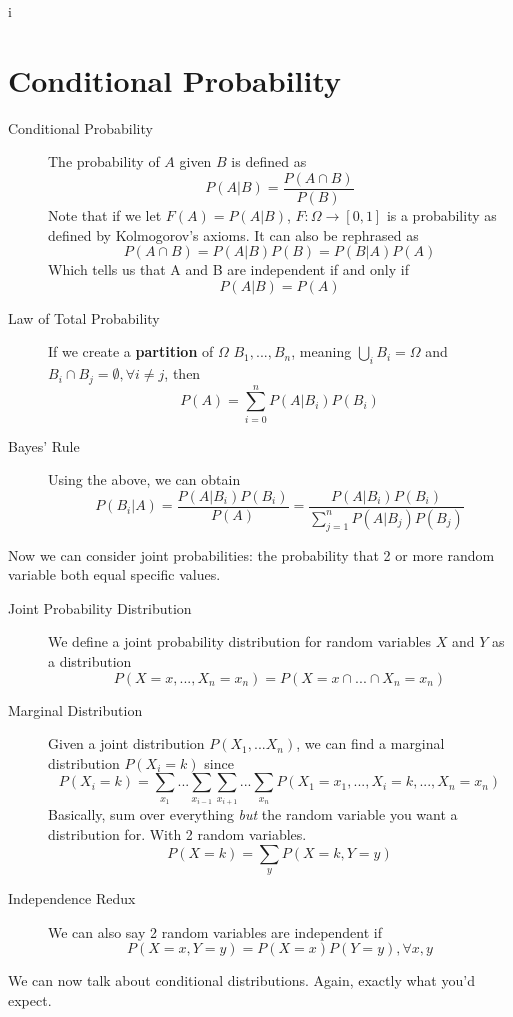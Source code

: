 i\documentclass[10pt]{article}
\begin{document}
\section{Conditional Probability}
\begin{description}
    \item[Conditional Probability] The probability of $A$ given $B$ is defined as
        \[ P(A|B) = \frac{P(A \cap B)}{P(B)} \]
    Note that if we let $F(A) = P(A|B)$, $F: \Omega \rightarrow [0,1]$ is a probability as defined by 
    Kolmogorov's axioms. It can also be rephrased as 
        \[ P(A \cap B) = P(A|B)P(B) = P(B|A)P(A) \]
    Which tells us that A and B are independent if and only if
        \[ P(A|B) = P(A) \]
    \item[Law of Total Probability] If we create a \textbf{partition} of $\Omega$ $B_1, ..., B_n$, meaning
        $\bigcup_i B_i = \Omega$ and $B_i \cap B_j = \emptyset, \forall i \neq j$, then
        \[ P(A) = \sum_{i=0}^n P(A|B_i)P(B_i) \] 
    \item[Bayes' Rule] Using the above, we can obtain
        \[ P(B_i|A) = \frac{P(A|B_i)P(B_i)}{P(A)} = \frac{P(A|B_i)P(B_i)}{\sum_{j = 1}^n P(A|B_j)P(B_j)} \]
\end{description}

Now we can consider joint probabilities: the probability that 2 or more random variable both equal specific values.

\begin{description}
    \item[Joint Probability Distribution] We define a joint probability distribution for random variables 
        $X$ and $Y$ as a distribution 
        \[P(X = x,..., X_n = x_n) = P(X = x \cap ... \cap  X_n = x_n)\]
    \item[Marginal Distribution] Given a joint distribution $P(X_1, ... X_n)$, we can find a marginal 
        distribution $P(X_i = k)$ since
        \[ P(X_i = k) = \sum_{x_1}...\sum_{x_{i-1}}\sum_{x_{i+1}}...\sum_{x_n} P(X_1 = x_1,...,X_i = k,...,X_n = x_n) \]
        Basically, sum over everything \textit{but} the random variable you want a distribution for. With 2 
        random variables.
        \[ P(X = k) = \sum_y P(X = k, Y = y) \]
    \item[Independence Redux] We can also say 2 random variables are independent if 
        \[P(X = x, Y = y) = P(X = x)P(Y = y), \forall x,y \]
\end{description}

We can now talk about conditional distributions. Again, exactly what you'd expect.
\end{document}
